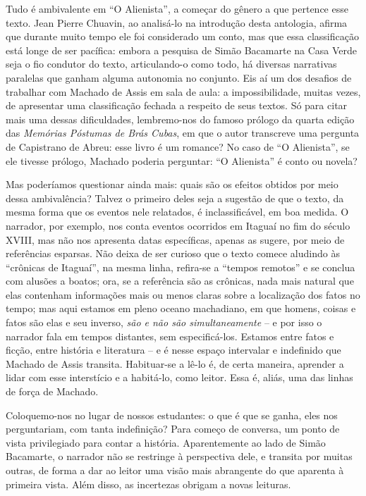 \documentclass{extarticle}
\begin{document}

Tudo é ambivalente em ``O Alienista'', a começar do gênero a que
pertence esse texto. Jean Pierre Chuavin, ao analisá-lo na introdução
desta antologia, afirma que durante muito tempo ele foi considerado um
conto, mas que essa classificação está longe de ser pacífica: embora a
pesquisa de Simão Bacamarte na Casa Verde seja o fio condutor do texto,
articulando-o como todo, há diversas narrativas paralelas que ganham
alguma autonomia no conjunto. Eis aí um dos desafios de trabalhar com
Machado de Assis em sala de aula: a impossibilidade, muitas vezes, de
apresentar uma classificação fechada a respeito de seus textos. Só para
citar mais uma dessas dificuldades, lembremo-nos do famoso prólogo da
quarta edição das \emph{Memórias Póstumas de Brás Cubas}, em que o autor
transcreve uma pergunta de Capistrano de Abreu: esse livro é um romance?
No caso de ``O Alienista'', se ele tivesse prólogo, Machado poderia
perguntar: ``O Alienista'' é conto ou novela?

Mas poderíamos questionar ainda mais: quais são os efeitos obtidos por
meio dessa ambivalência? Talvez o primeiro deles seja a sugestão de que
o texto, da mesma forma que os eventos nele relatados, é
inclassificável, em boa medida. O narrador, por exemplo, nos conta
eventos ocorridos em Itaguaí no fim do século XVIII, mas não nos
apresenta datas específicas, apenas as sugere, por meio de referências
esparsas. Não deixa de ser curioso que o texto comece aludindo às
``crônicas de Itaguaí'', na mesma linha, refira-se a ``tempos remotos''
e se conclua com alusões a boatos; ora, se a referência são as crônicas,
nada mais natural que elas contenham informações mais ou menos claras
sobre a localização dos fatos no tempo; mas aqui estamos em pleno oceano
machadiano, em que homens, coisas e fatos são elas e seu inverso,
\emph{são e não são simultaneamente} -- e por isso o narrador fala em
tempos distantes, sem especificá-los. Estamos entre fatos e ficção,
entre história e literatura -- e é nesse espaço intervalar e indefinido
que Machado de Assis transita. Habituar-se a lê-lo é, de certa maneira,
aprender a lidar com esse interstício e a habitá-lo, como leitor. Essa
é, aliás, uma das linhas de força de Machado.

Coloquemo-nos no lugar de nossos estudantes: o que é que se ganha, eles
nos perguntariam, com tanta indefinição? Para começo de conversa, um
ponto de vista privilegiado para contar a história. Aparentemente ao
lado de Simão Bacamarte, o narrador não se restringe à perspectiva dele,
e transita por muitas outras, de forma a dar ao leitor uma visão mais
abrangente do que aparenta à primeira vista. Além disso, as incertezas
obrigam a novas leituras.
\end{document}
